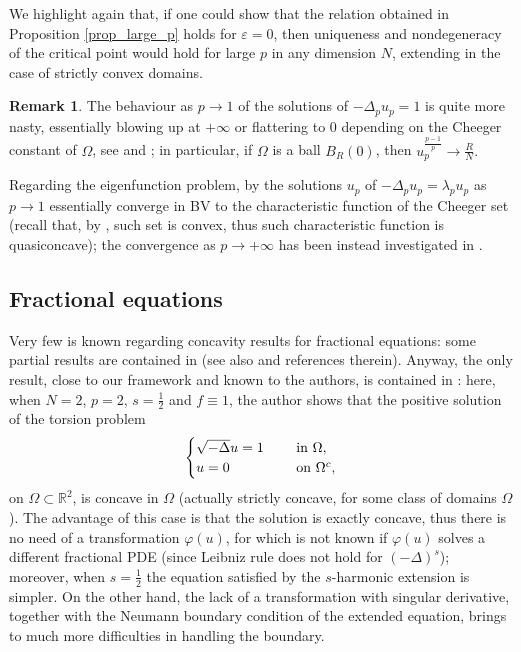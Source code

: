 \documentclass[11pt, reqno]{amsart}
\theoremstyle{definition}
\newtheorem{remark}[lemma]{Remark}
\numberwithin{equation}{section}
\newcommand{\R}{\mathbb{R}}
\def\eps{\varepsilon}
\begin{document}
We highlight again that, if one could show that the relation obtained in Proposition \ref{prop_large_p} holds for $\eps=0$, then uniqueness and nondegeneracy of the critical point would hold for large $p$ in any dimension $N$, extending \cite{BMS23} in the case of strictly convex domains.

\begin{remark}
The behaviour as $p\to 1$ of the solutions of $-\Delta_p u_p = 1$ is quite more nasty, essentially blowing up at $+\infty$ or flattering 
to $0$ depending on the Cheeger constant of $\Omega$, see \cite[Section 3 and 4]{Kaw90} and \cite{BEM16}; in particular, if $\Omega$ is a ball $B_R(0)$, then
$u_p^{\frac{p-1}{p}} \to \frac{R}{N}.$

Regarding the eigenfunction problem, by \cite[Remark 10]{KaFr03} the solutions $u_p$ of $-\Delta_p u_p = \lambda_p u_p$ as $p\to 1$ essentially converge in BV to the characteristic function of the Cheeger set (recall that, by \cite{AlCa09}, such set is convex, thus such characteristic function is quasiconcave); 
the convergence as $p \to +\infty$ has been instead investigated in \cite{JLM99}.
\end{remark}


\subsection{Fractional equations}
\label{sec_fractional}

Very few is known regarding concavity results for fractional equations: some partial results are contained in \cite{Gre14} (see also \cite{JKS19} and references therein).
Anyway, the only result, close to our framework and known to the authors, is contained in \cite{Kul17}: here, when $N=2$, $p=2$, $s=\frac{1}{2}$ and $f \equiv 1$, the author shows that the positive solution of the torsion problem
$$
\begin{cases}
\sqrt{-\Delta} u = 1 & \quad \hbox{ in $\Omega$},\\ 
u =0 & \quad \hbox{ on $\Omega^c$,}
\end{cases}
$$
on $\Omega \subset \R^2$, is concave in $\Omega$ (actually strictly concave, for some class of domains $\Omega$). 
The advantage of this case is that the solution is exactly concave, thus there is no need of a transformation $\varphi(u)$, for which is not known if $\varphi(u)$ solves a different fractional PDE (since Leibniz rule does not hold for $(-\Delta)^s$); moreover, when $s=\frac{1}{2}$ the equation satisfied by the $s$-harmonic extension is simpler. 
On the other hand, the lack of a transformation with singular derivative, together with the Neumann boundary condition of the extended equation, brings to much more difficulties in handling the boundary.
\end{document}
